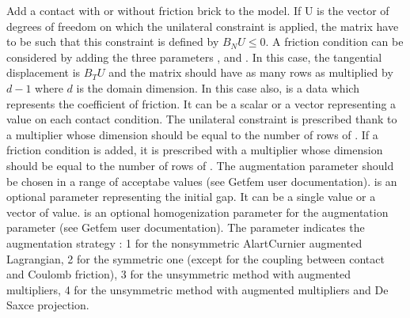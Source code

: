 \documentclass[a4paper,11pt,english]{sphinxmanual}
\begin{document}
\begin{fulllineitems}
\begin{fulllineitems}
Add a contact with or without friction brick to the model.
If U is the vector
of degrees of freedom on which the unilateral constraint is applied,
the matrix  have to be such that this constraint is defined by
\(B_N U \le 0\). A friction condition can be considered by adding
the three parameters ,  and .
In this case, the tangential displacement is \(B_T U\) and
the matrix  should have as many rows as  multiplied by
\(d-1\) where \(d\) is the domain dimension.
In this case also,  is a data which represents
the coefficient of friction. It can be a scalar or a vector representing a
value on each contact condition.  The unilateral constraint is prescribed
thank to a multiplier
 whose dimension should be equal to the number of rows of
. If a friction condition is added, it is prescribed with a
multiplier  whose dimension should be equal to the number
of rows of . The augmentation parameter  should be chosen in
a range of
acceptabe values (see Getfem user documentation).  is an
optional parameter representing the initial gap. It can be a single value
or a vector of value.  is an optional homogenization
parameter for the augmentation parameter
(see Getfem user documentation).  The parameter 
indicates the augmentation strategy : 1 for the non\sphinxhyphen{}symmetric
Alart\sphinxhyphen{}Curnier augmented Lagrangian, 2 for the symmetric one (except for
the coupling between contact and Coulomb friction), 3 for the
unsymmetric method with augmented multipliers, 4 for the unsymmetric
method with augmented multipliers and De Saxce projection.

\end{fulllineitems}



\end{fulllineitems}
\end{document}
